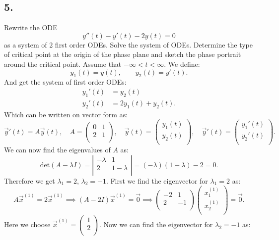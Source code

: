 \subsection*{5.} Rewrite the ODE
\[ 
y''(t) - y'(t) - 2y(t) = 0
\]
as a system of 2 first order ODEs. Solve the system of ODEs. Determine the type of critical point at the origin of the phase plane and sketch the phase portrait around the critical point. Assume that $- \infty < t < \infty$.
\bigbreak
We define:
\[ 
y_1(t) = y(t), \qquad y_2(t) = y'(t)
.\]
And get the system of first order ODEs:
\begin{align*}
  y_1'(t) &= y_2(t) \\
  y_2'(t) &= 2y_1(t) + y_2(t)
.\end{align*}
Which can be written on vector form as:
\[ 
\Vec{y}'(t) = A \Vec{y}(t), \quad A = \begin{pmatrix}
0 & 1\\
2 & 1\\
\end{pmatrix}, \quad \Vec{y}(t) = \begin{pmatrix}
y_1(t)\\
y_2(t)\\
\end{pmatrix}, \quad \Vec{y}'(t) = \begin{pmatrix}
y_1'(t)\\
y_2'(t)\\
\end{pmatrix}
.\]
We can now find the eigenvalues of $A$ as:
\[ 
\mathrm{det}(A - \lambda I) = \left| \begin{array}{cc}
-\lambda & 1\\
2 & 1 - \lambda\\
\end{array} \right| = (-\lambda)(1-\lambda) - 2 = 0
.\]
Therefore we get $\lambda_1 = 2$, $\lambda_2 = -1$. 
First we find the eigenvector for $\lambda_1 = 2$ as:
\[ 
A \Vec{x}^{(1)} = 2 \Vec{x}^{(1)} \implies \left( A - 2 I \right) \Vec{x}^{(1)} = \Vec{0} \implies \begin{pmatrix}
-2 & 1\\
2 & -1\\
\end{pmatrix} \begin{pmatrix}
x_1^{(1)}\\
x_2^{(1)}\\
\end{pmatrix} = \Vec{0}
.\]
Here we choose $\Vec{x}^{(1)} = \begin{pmatrix}
1\\
2\\
\end{pmatrix}$. Now we can find the eigenvector for $\lambda_2 = -1$ as:
